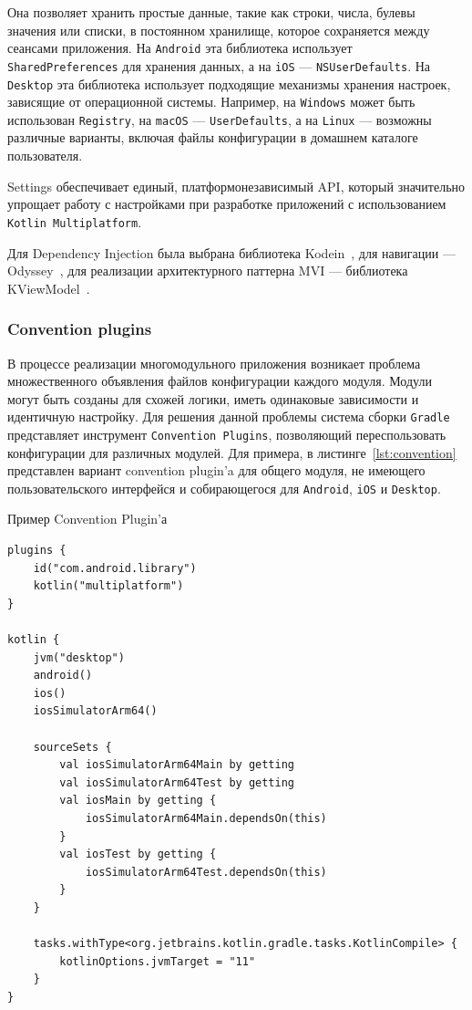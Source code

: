 \documentclass[14pt, russian]{scrartcl}
\begin{document}
Она позволяет хранить простые данные, такие как строки, числа, булевы значения или списки, в постоянном хранилище, которое сохраняется между сеансами приложения. На \texttt{Android} эта библиотека использует \texttt{SharedPreferences} для хранения данных, а на \texttt{iOS} --- \texttt{NSUserDefaults}. На \texttt{Desktop} эта библиотека использует подходящие механизмы хранения настроек, зависящие от операционной системы. Например, на \texttt{Windows} может быть использован \texttt{Registry}, на \texttt{macOS} --- \texttt{UserDefaults}, а на \texttt{Linux} --- возможны различные варианты, включая файлы конфигурации в домашнем каталоге пользователя.

Settings обеспечивает единый, платформонезависимый API, который значительно упрощает работу с настройками при разработке приложений с использованием \texttt{Kotlin Multiplatform}.

Для Dependency Injection была выбрана библиотека Kodein~\cite{kodein}, для навигации --- Odyssey~\cite{odyssey}, для реализации архитектурного паттерна MVI --- библиотека KViewModel~\cite{kvmodel}.

\subsubsection{Convention plugins}\label{sect:convention}

В процессе реализации многомодульного приложения возникает проблема множественного объявления файлов конфигурации каждого модуля. Модули могут быть созданы для схожей логики, иметь одинаковые зависимости и идентичную настройку. Для решения данной проблемы система сборки \texttt{Gradle} представляет инструмент \texttt{Сonvention Plugins}, позволяющий переспользовать конфигурации для различных модулей. Для примера, в листинге~\ref{lst:convention} представлен вариант convention plugin'a для общего модуля, не имеющего пользовательского интерфейся и собирающегося для \texttt{Android}, \texttt{iOS} и \texttt{Desktop}.

\begin{listing}[!htb]
\caption{Пример Convention Plugin'а}
\label{lst:convention}
\begin{verbatim}
plugins {
    id("com.android.library")
    kotlin("multiplatform")
}

kotlin {
    jvm("desktop")
    android()
    ios()
    iosSimulatorArm64()

    sourceSets {
        val iosSimulatorArm64Main by getting
        val iosSimulatorArm64Test by getting
        val iosMain by getting {
            iosSimulatorArm64Main.dependsOn(this)
        }
        val iosTest by getting {
            iosSimulatorArm64Test.dependsOn(this)
        }
    }

    tasks.withType<org.jetbrains.kotlin.gradle.tasks.KotlinCompile> {
        kotlinOptions.jvmTarget = "11"
    }
}
\end{verbatim}
\end{listing}
\end{document}
